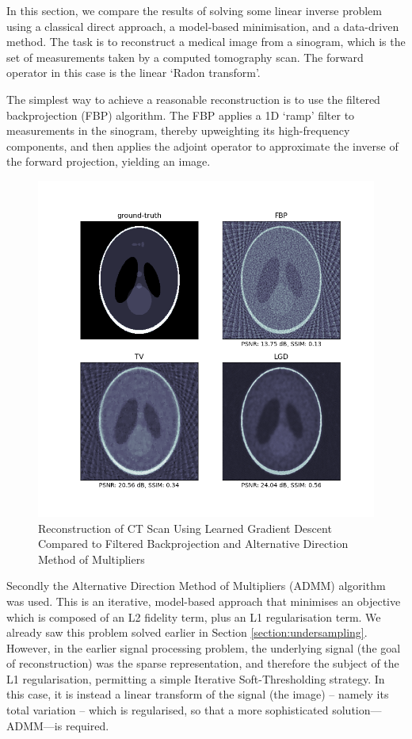 \documentclass[12pt]{article}
\begin{document}
In this section, we compare the results of solving some linear inverse problem using a classical direct approach,
a model-based minimisation, and a data-driven method.
The task is to reconstruct a medical image from a sinogram,
which is the set of measurements taken by a computed tomography scan.
The forward operator in this case is the linear `Radon transform'.

The simplest way to achieve a reasonable reconstruction is to use the filtered backprojection (FBP) algorithm.
The FBP applies a 1D `ramp' filter to measurements in the sinogram,
thereby upweighting its high-frequency components,
and then applies the adjoint operator to approximate the inverse of the forward projection,
yielding an image.

\begin{figure}[htp]
    \includegraphics[scale=0.65, center]{figures/lgd.png}
    \caption{Reconstruction of CT Scan Using Learned Gradient Descent Compared to Filtered Backprojection and Alternative Direction Method of Multipliers}
    \label{fig:lgd}
\end{figure}

Secondly the Alternative Direction Method of Multipliers (ADMM) algorithm was used.
This is an iterative, model-based approach that minimises an objective which is composed of an L2 fidelity term, plus an L1 regularisation term.
We already saw this problem solved earlier in Section \ref{section:undersampling}.
However, in the earlier signal processing problem, the underlying signal (the goal of reconstruction) was the sparse representation,
and therefore the subject of the L1 regularisation, permitting a simple Iterative Soft-Thresholding strategy.
In this case, it is instead a linear transform of the signal (the image) -- namely its total variation -- which is regularised,
so that a more sophisticated solution---ADMM---is required.
\end{document}
